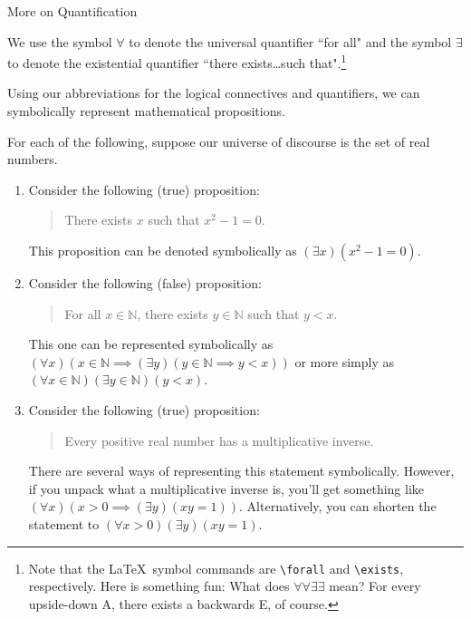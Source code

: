 \begin{section}{More on Quantification}
\begin{definition}
We use the symbol $\forall$ to denote the universal quantifier ``for all" and the symbol $\exists$ to denote the existential quantifier ``there exists\ldots such that".\footnote{Note that the \LaTeX\ symbol commands are \texttt{\textbackslash forall} and \texttt{\textbackslash exists}, respectively. Here is something fun: What does $\forall \forall \exists\exists$ mean?  For every upside-down A, there exists a backwards E, of course.}
\end{definition}

Using our abbreviations for the logical connectives and quantifiers, we can symbolically represent mathematical propositions.

\begin{example}
For each of the following, suppose our universe of discourse is the set of real numbers.
\begin{enumerate}

\item Consider the following (true) proposition:

\begin{quote}
There exists $x$ such that $x^2-1=0$.
\end{quote}

This proposition can be denoted symbolically as $(\exists x)(x^2-1=0)$.

\item Consider the following (false) proposition:

\begin{quote}
For all $x\in \mathbb{N}$, there exists $y\in\mathbb{N}$ such that $y<x$.
\end{quote}

This one can be represented symbolically as $(\forall x)(x\in\mathbb{N}\implies (\exists y)(y\in\mathbb{N}\implies y<x))$ or more simply as $(\forall x\in\mathbb{N})(\exists y\in\mathbb{N})(y<x)$.

\item Consider the following (true) proposition:

\begin{quote}
Every positive real number has a multiplicative inverse.
\end{quote}

There are several ways of representing this statement symbolically.  However, if you unpack what a multiplicative inverse is, you'll get something like $(\forall x)(x>0 \implies (\exists y)(xy=1))$.  Alternatively, you can shorten the statement to $(\forall x>0)(\exists y)(xy=1)$.


\end{enumerate}
\end{example}
\end{section}
